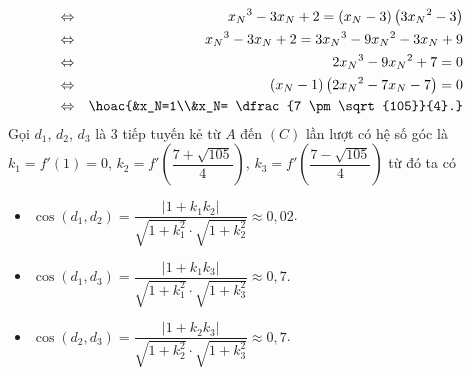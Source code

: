 \begin{ex}
{\begin{itemchoice}
\begin{eqnarray*}
				&\Leftrightarrow& {x_N}^3-3x_N+2 = \left(x_N-3\right)\left(3{x_N}^2-3\right)\\
				&\Leftrightarrow& {x_N}^3-3x_N+2 = 3{x_N}^3-9{x_N}^2-3x_N+9 \\
				&\Leftrightarrow& 2{x_N}^3-9{x_N}^2+7 = 0 \\
				&\Leftrightarrow& \left(x_N-1\right)\left(2{x_N}^2-7x_N-7\right) = 0\\
				&\Leftrightarrow& \hoac{&x_N=1\\&x_N= \dfrac{7 \pm \sqrt{105}}{4}.}
			\end{eqnarray*}
			Gọi $d_1$, $d_2$, $d_3$ là $3$ tiếp tuyến kẻ từ $A$ đến $\left(C\right)$ lần lượt có hệ số góc là $k_1=f'\left(1\right)=0$, $k_2=f'\left(\dfrac{7+ \sqrt{105}}{4}\right)$, $k_3=f'\left(\dfrac{7-\sqrt{105}}{4}\right)$ từ đó ta có
			\begin{itemize}
				\item $\cos (d_1,d_2)=\dfrac{\left|1+k_1 k_2\right|}{\sqrt{1+k_1^2} \cdot \sqrt{1+k_2^2}} \approx 0{,}02$.
				\item $\cos (d_1,d_3)=\dfrac{\left|1+k_1 k_3\right|}{\sqrt{1+k_1^2} \cdot \sqrt{1+k_3^2}}\approx 0{,}7$.
				\item $\cos (d_2,d_3)=\dfrac{\left|1+k_2 k_3\right|}{\sqrt{1+k_2^2} \cdot \sqrt{1+k_3^2}}\approx 0{,}7$.
			\end{itemize}
		\end{itemchoice}
	}
\end{ex}

